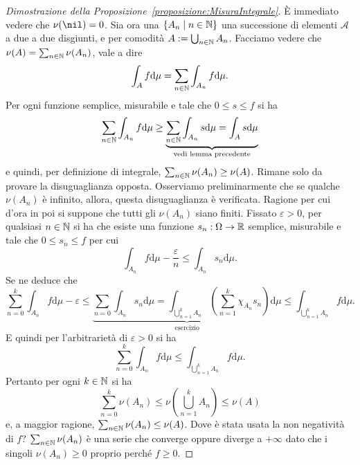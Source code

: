 \begin{proof}[Dimostrazione della Proposizione~\ref{proposizione:MisuraIntegrale}]
È immediato vedere che \(\nu(\nil) = 0\). Sia ora una \(\left\{A_n \mid n \in \mathbb N\right\}\) una successione di elementi \(\mathcal A\) a due a due disgiunti, e per comodità \(A := \bigcup_{n \in \mathbb N} A_n\). Facciamo vedere che \(\nu (A) = \sum_{n \in \mathbb N} \nu(A_n)\), vale a dire 
\[\int_A f \mathrm d \mu = \sum_{n \in \mathbb N} \int_{A_n} f \mathrm d \mu .\]
Per ogni funzione semplice, misurabile e tale che \(0 \le s \le f\) si ha
\[\sum_{n \in \mathbb N} \int_{A_n} f \mathrm d \mu \ge \underbrace{\sum_{n \in \mathbb N} \int_{A_n} s \mathrm d \mu = \int_A s \mathrm d \mu}_{\text{vedi lemma precedente}}\]
e quindi, per definizione di integrale, \(\sum_{n \in \mathbb N} \nu(A_n) \ge \nu(A)\).\newline
Rimane solo da provare la disuguaglianza opposta. Osserviamo preliminarmente che se qualche \(\nu(A_n)\) è infinito, allora, questa disuguaglianza è verificata. Ragione per cui d'ora in poi si suppone che tutti gli \(\nu(A_n)\) siano finiti. Fissato \(\varepsilon > 0\), per qualsiasi \(n \in \mathbb N\) si ha che esiste una funzione \(s_n : \Omega \to \mathbb R\) semplice, misurabile e tale che \(0 \le s_n \le f\) per cui
\[\int_{A_n} f \mathrm d \mu - \frac \varepsilon n \le \int_{A_n} s_n \mathrm d \mu .\]
Se ne deduce che
\[\sum_{n=0}^k \int_{A_n} f \mathrm d \mu - \varepsilon \le \underbrace{\sum_{n=0} \int_{A_n} s_n \mathrm d \mu = \int_{\bigcup_{n=1}^k A_n} \left( \sum_{n=1}^k \chi_{A_n} s_n \right) \mathrm d \mu}_{\text{esercizio}} \le \int_{\bigcup_{n=1}^k A_n} f \mathrm d \mu .\]
E quindi per l'arbitrarietà di \(\varepsilon > 0\) si ha
\[\sum_{n=0}^k \int_{A_n} f \mathrm d \mu \le \int_{\bigcup_{n=1}^k A_n} f \mathrm d \mu .\]
Pertanto per ogni \(k \in \mathbb N\) si ha
\[\sum_{n=0}^k \nu(A_n) \le \nu\left(\bigcup_{n=1}^k A_n\right) \le \nu(A) \]
e, a maggior ragione, \(\sum_{n \in \mathbb N} \nu(A_n) \le \nu(A)\). Dove è stata usata la non negatività di \(f\)? \(\sum_{n \in \mathbb N} \nu(A_n)\) è una serie che converge oppure diverge a \(+\infty\) dato che i singoli \(\nu(A_n) \ge 0\) proprio perché \(f \ge 0\).
\end{proof}

